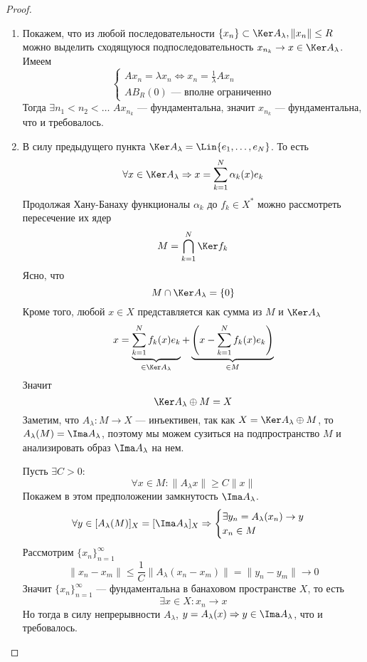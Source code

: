 \begin{proof}
	\hfill
	\begin{enumerate}
		\item Покажем, что из любой последовательности $\{x_n\} \subset \Ker A_\lambda, \|x_n\| \leq R$ можно выделить сходящуюся подпоследовательность $x_{n_k}\to x \in \Ker A_\lambda$. Имеем
		$$
		\begin{cases}
			Ax_n = \lambda x_n  \Leftrightarrow x_n = \frac{1}{\lambda}Ax_n\\
			AB_R(0) \text{ --- вполне ограниченно}
		\end{cases} 
		$$
		Тогда $ \exists n_1< n_2 < \dots$ $Ax_{n_k}$ --- фундаментальна, значит $x_{n_k}$ --- фундаментальна, что и требовалось.
		\item В силу предыдущего пункта $\Ker A_\lambda = \Lin \{e_1, \dots ,e_N\}$. То есть
		$$
		\forall x \in \Ker A_\lambda \Rightarrow x = \sum_{k=1}^N \alpha_k(x)e_k
		$$
		Продолжая Хану-Банаху функционалы $\alpha_k$ до $f_k \in X^*$ можно рассмотреть пересечение их ядер
		$$
		M = \bigcap_{k=1}^N\Ker f_k
		$$
		Ясно, что
		$$
		M \cap \Ker A_\lambda = \{0\}
		$$
		Кроме того, любой $x \in X$ представляется как сумма из $M$ и $\Ker A_\lambda$
		$$
		x = \underbrace{\sum_{k=1}^N f_k(x) e_k}_{\in \Ker A_\lambda} + \underbrace{\left(x - \sum_{k=1}^N f_k(x) e_k\right)}_{\in M}
		$$
Значит
		$$
		\Ker A_\lambda \oplus M = X
		$$
		Заметим, что $A_\lambda \colon M \to X$ --- инъективен, так как $X = \Ker A_\lambda \oplus M$, то $A_\lambda(M) = \Ima A_\lambda$, поэтому мы можем сузиться на подпространство $M$ и анализировать образ $\Ima A_\lambda$ на нем. 
		
		
		Пусть $\exists C > 0$:
		$$
		\forall x \in M\colon \|A_\lambda x\| \geq C\|x\| 
		$$
	Покажем в этом предположении замкнутость $\Ima A_\lambda$.
		$$
		\forall y \in [A_\lambda(M)]_X = [\Ima A_\lambda]_X \Rightarrow \begin{cases}
			\exists y_n = A_\lambda(x_n) \to y \\
			x_n \in M
		\end{cases}
		$$
		Рассмотрим $\{x_n\}_{n=1}^\infty$
		$$
		\|x_n - x_m\| \leq \frac{1}{C}\|A_\lambda(x_n - x_m)\| = \|y_n - y_m\| \to 0 
		$$
		Значит $\{x_n\}_{n=1}^\infty$ --- фундаментальна в банаховом пространстве $X$, то есть
		$$
		\exists x \in X \colon x_n \to x 
		$$
		Но тогда в силу непрерывности $A_\lambda$, $y = A_\lambda(x) \Rightarrow y \in \Ima A_\lambda$, что и требовалось. 
		

\end{enumerate}
\end{proof}
